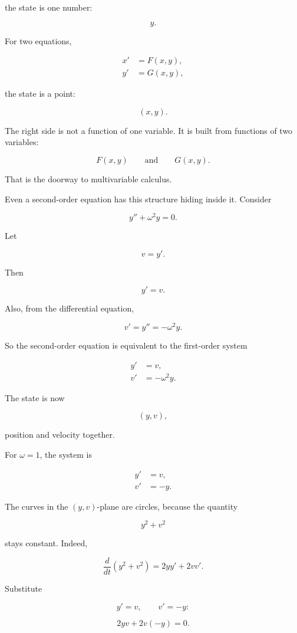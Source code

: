 the state is one number:

\[
y.
\]

For two equations,

\[
\begin{aligned}
x'&=F(x,y),\\
y'&=G(x,y),
\end{aligned}
\]

the state is a point:

\[
(x,y).
\]

The right side is not a function of one variable.  It is built from functions of two
variables:

\[
F(x,y)
\qquad\text{and}\qquad
G(x,y).
\]

That is the doorway to multivariable calculus.

Even a second-order equation has this structure hiding inside it.  Consider

\[
y''+\omega^2y=0.
\]

Let

\[
v=y'.
\]

Then

\[
y'=v.
\]

Also, from the differential equation,

\[
v'=y''=-\omega^2y.
\]

So the second-order equation is equivalent to the first-order system

\[
\boxed{
\begin{aligned}
y'&=v,\\
v'&=-\omega^2y.
\end{aligned}
}
\]

The state is now

\[
(y,v),
\]

position and velocity together.

For \(\omega=1\), the system is

\[
\begin{aligned}
y'&=v,\\
v'&=-y.
\end{aligned}
\]

The curves in the \((y,v)\)-plane are circles, because the quantity

\[
y^2+v^2
\]

stays constant.  Indeed,

\[
\frac{d}{dt}(y^2+v^2)=2yy'+2vv'.
\]

Substitute

\[
y'=v,
\qquad
v'=-y:
\]

\[
2y v+2v(-y)=0.
\]

